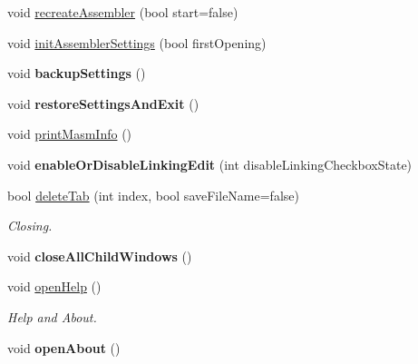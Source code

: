 \begin{DoxyCompactItemize}
\item 
void \hyperlink{class_main_window_a4f00b18cd52e8ba0ef80cca56559cead}{recreate\+Assembler} (bool start=false)
\item 
void \hyperlink{class_main_window_ac778aed78fb6c50fecbdb174bad1b293}{init\+Assembler\+Settings} (bool first\+Opening)
\item 
\hypertarget{class_main_window_aeae98b66b64ca9c75095b6cbac38f4a2}{}void {\bfseries backup\+Settings} ()\label{class_main_window_aeae98b66b64ca9c75095b6cbac38f4a2}

\item 
\hypertarget{class_main_window_a555711d04fe9b975d620fbe79dbfdd87}{}void {\bfseries restore\+Settings\+And\+Exit} ()\label{class_main_window_a555711d04fe9b975d620fbe79dbfdd87}

\item 
void \hyperlink{class_main_window_a1f08865148ab71e63a82bff98cbd17c8}{print\+Masm\+Info} ()
\item 
\hypertarget{class_main_window_aa6eb8abce0304d5e6f84097dd433122b}{}void {\bfseries enable\+Or\+Disable\+Linking\+Edit} (int disable\+Linking\+Checkbox\+State)\label{class_main_window_aa6eb8abce0304d5e6f84097dd433122b}

\item 
bool \hyperlink{class_main_window_a2b789b53a039e5c900fccba3881cc16b}{delete\+Tab} (int index, bool save\+File\+Name=false)
\begin{DoxyCompactList}\small\item\em Closing. \end{DoxyCompactList}\item 
\hypertarget{class_main_window_a4f95292d59c2795f60e74b15b7b82af9}{}void {\bfseries close\+All\+Child\+Windows} ()\label{class_main_window_a4f95292d59c2795f60e74b15b7b82af9}

\item 
void \hyperlink{class_main_window_a4037900bbe42daa151e96ba5c96c8f62}{open\+Help} ()
\begin{DoxyCompactList}\small\item\em Help and About. \end{DoxyCompactList}\item 
\hypertarget{class_main_window_a06bcc3ac679ebab877652fc0d69744ea}{}void {\bfseries open\+About} ()\label{class_main_window_a06bcc3ac679ebab877652fc0d69744ea}

\end{DoxyCompactItemize}
